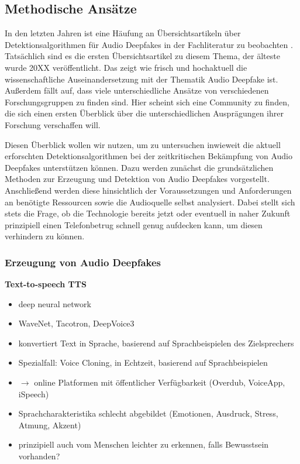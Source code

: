 \subsection{Methodische Ansätze}
In den letzten Jahren ist eine Häufung an Übersichtsartikeln über Detektionsalgorithmen für Audio Deepfakes in der Fachliteratur zu beobachten \citep[][]{Masood2022,Almutairi2022,Khanjani2021}.
Tatsächlich sind es die ersten Übersichtsartikel zu diesem Thema, der älteste wurde 20XX veröffentlicht. %
Das zeigt wie frisch und hochaktuell die wissenschaftliche Auseinandersetzung mit der Thematik Audio Deepfake ist.
Außerdem fällt auf, dass viele unterschiedliche Ansätze von verschiedenen Forschungsgruppen zu finden sind.
Hier scheint sich eine Community zu finden, die sich einen ersten Überblick über die unterschiedlichen Ausprägungen ihrer Forschung verschaffen will.

Diesen Überblick wollen wir nutzen, um zu untersuchen inwieweit die aktuell erforschten Detektionsalgorithmen bei der zeitkritischen Bekämpfung von Audio Deepfakes unterstützen können.
Dazu werden zunächst die grundsätzlichen Methoden zur Erzeugung und Detektion von Audio Deepfakes vorgestellt.
Anschließend werden diese hinsichtlich der Voraussetzungen und Anforderungen an benötigte Ressourcen sowie die Audioquelle selbst analysiert.
Dabei stellt sich stets die Frage, ob die Technologie bereits jetzt oder eventuell in naher Zukunft prinzipiell einen Telefonbetrug schnell genug aufdecken kann, um diesen verhindern zu können.

\clearpage
\subsubsection{Erzeugung von Audio Deepfakes}
\textbf{Text-to-speech TTS} \citep[][]{Masood2022}
\begin{itemize}
  \item deep neural network
  \item WaveNet, Tacotron, DeepVoice3
  \item konvertiert Text in Sprache, basierend auf Sprachbeispielen des Zielsprechers
  \item Spezialfall: Voice Cloning, in Echtzeit, basierend auf Sprachbeispielen
  \item $\rightarrow$ online Platformen mit öffentlicher Verfügbarkeit (Overdub, VoiceApp, iSpeech)
  \item Sprachcharakteristika schlecht abgebildet (Emotionen, Ausdruck, Stress, Atmung, Akzent)
  \item prinzipiell auch vom Menschen \glqq{}leichter\grqq{} zu erkennen, falls Bewusstsein vorhanden?
\end{itemize}

